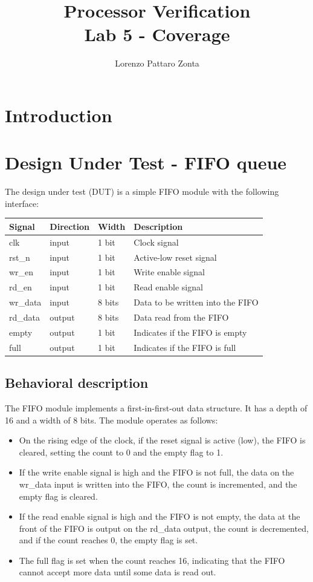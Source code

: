 \documentclass{article}
\title{Processor Verification \\Lab 5 - Coverage}
\author{Lorenzo Pattaro Zonta}
\begin{document}
\maketitle

\section*{Introduction}

\section*{Design Under Test - FIFO queue}
The design under test (DUT) is a simple FIFO module with the following interface:

\begin{table}[H]
\centering
    \begin{tabular}{|l|l|l|p{8cm}|}
      \hline
      \textbf{Signal} & \textbf{Direction} & \textbf{Width} & \textbf{Description} \\
      \hline
      clk & input & 1 bit & Clock signal \\
      rst\_n & input & 1 bit & Active-low reset signal \\
      wr\_en & input & 1 bit & Write enable signal \\
      rd\_en & input & 1 bit & Read enable signal \\
      wr\_data & input & 8 bits & Data to be written into the FIFO \\
      rd\_data & output & 8 bits & Data read from the FIFO \\
      empty & output & 1 bit & Indicates if the FIFO is empty \\
      full & output & 1 bit & Indicates if the FIFO is full \\
      \hline
    \end{tabular}
\end{table}

\subsection*{Behavioral description}
The FIFO module implements a first-in-first-out data structure. It has a depth of 16 and a width of 8 bits. The module operates as follows:
\begin{itemize}
  \item On the rising edge of the clock, if the reset signal is active (low), the FIFO is cleared, setting the count to 0 and the empty flag to 1.
  \item If the write enable signal is high and the FIFO is not full, the data on the wr\_data input is written into the FIFO, the count is incremented, and the empty flag is cleared.
  \item If the read enable signal is high and the FIFO is not empty, the data at the front of the FIFO is output on the rd\_data output, the count is decremented, and if the count reaches 0, the empty flag is set.
  \item The full flag is set when the count reaches 16, indicating that the FIFO cannot accept more data until some data is read out.
\end{itemize}
\end{document}
